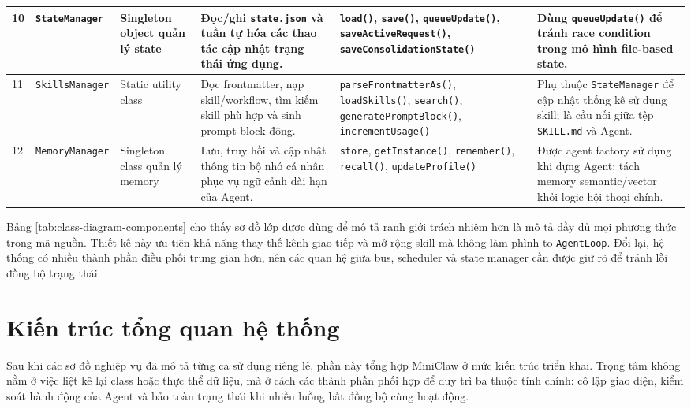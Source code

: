 \begin{longtable}{|p{0.55cm}|p{2.25cm}|p{1.95cm}|p{3.2cm}|p{3.0cm}|p{3.05cm}|}
\hline
10 & \texttt{State}\newline\texttt{Manager} & Singleton object quản lý state & Đọc/ghi \texttt{state.json} và tuần tự hóa các thao tác cập nhật trạng thái ứng dụng. & \texttt{load()}, \texttt{save()}, \texttt{queueUpdate()}, \texttt{saveActive}\newline\texttt{Request()}, \texttt{save}\newline\texttt{Consolidation}\newline\texttt{State()} & Dùng \texttt{queueUpdate()} để tránh race condition trong mô hình file-based state. \\
\hline
11 & \texttt{Skills}\newline\texttt{Manager} & Static utility class & Đọc frontmatter, nạp skill/workflow, tìm kiếm skill phù hợp và sinh prompt block động. & \texttt{parse}\newline\texttt{FrontmatterAs()}, \texttt{loadSkills()}, \texttt{search()}, \texttt{generatePrompt}\newline\texttt{Block()}, \texttt{incrementUsage()} & Phụ thuộc \texttt{StateManager} để cập nhật thống kê sử dụng skill; là cầu nối giữa tệp \texttt{SKILL.md} và Agent. \\
\hline
12 & \texttt{Memory}\newline\texttt{Manager} & Singleton class quản lý memory & Lưu, truy hồi và cập nhật thông tin bộ nhớ cá nhân phục vụ ngữ cảnh dài hạn của Agent. & \texttt{store}, \texttt{getInstance()}, \texttt{remember()}, \texttt{recall()}, \texttt{updateProfile()} & Được agent factory sử dụng khi dựng Agent; tách memory semantic/vector khỏi logic hội thoại chính. \\
\hline
\end{longtable}

\endgroup

Bảng \ref{tab:class-diagram-components} cho thấy sơ đồ lớp được dùng để mô tả ranh giới trách nhiệm hơn là mô tả đầy đủ mọi phương thức trong mã nguồn. Thiết kế này ưu tiên khả năng thay thế kênh giao tiếp và mở rộng skill mà không làm phình to \texttt{AgentLoop}. Đổi lại, hệ thống có nhiều thành phần điều phối trung gian hơn, nên các quan hệ giữa bus, scheduler và state manager cần được giữ rõ để tránh lỗi đồng bộ trạng thái.

\section{Kiến trúc tổng quan hệ thống}

Sau khi các sơ đồ nghiệp vụ đã mô tả từng ca sử dụng riêng lẻ, phần này tổng hợp MiniClaw ở mức kiến trúc triển khai. Trọng tâm không nằm ở việc liệt kê lại class hoặc thực thể dữ liệu, mà ở cách các thành phần phối hợp để duy trì ba thuộc tính chính: cô lập giao diện, kiểm soát hành động của Agent và bảo toàn trạng thái khi nhiều luồng bất đồng bộ cùng hoạt động.

